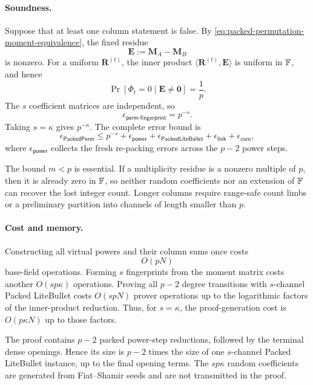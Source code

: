 \documentclass[runningheads]{llncs}
\begin{document}
\paragraph{Soundness.}
Suppose that at least one column statement is false.  By
\eqref{eq:packed-permutation-moment-equivalence}, the fixed residue
\[
    \bm E:=\bm M_A-\bm M_B
\]
is nonzero.  For a uniform \(\bm R^{(t)}\), the inner product
\(\langle\bm R^{(t)},\bm E\rangle\) is uniform in \({\mathbb{F}}\), and hence
\[
    \Pr[\Phi_t=0\mid\bm E\neq\bm0]=\frac1p.
\]
The \(s\) coefficient matrices are independent, so
\begin{equation}
    \boxed{
    \epsilon_{\mathsf{perm\mbox{-}fingerprint}}
      =p^{-s}.
    }
\label{eq:packed-permutation-soundness}
\end{equation}
Taking \(s=\kappa\) gives \(p^{-\kappa}\).  The complete error bound is
\[
    \epsilon_{\mathsf{PackedPerm}}
      \leq
      p^{-s}
      +\epsilon_{\mathsf{power}}
      +\epsilon_{\mathsf{PackedLiteBullet}}
      +\epsilon_{\mathsf{link}}
      +\epsilon_{\mathsf{com}},
\]
where \(\epsilon_{\mathsf{power}}\) collects the fresh re-packing
errors across the \(p-2\) power steps.

The bound \(m<p\) is essential.  If a multiplicity residue is a
nonzero multiple of \(p\), then it is already zero in \({\mathbb{F}}\), so
neither random coefficients nor an extension of \({\mathbb{F}}\) can recover
the lost integer count.  Longer columns require range-safe count limbs
or a preliminary partition into channels of length smaller than \(p\).

\paragraph{Cost and memory.}
Constructing all virtual powers and their column sums once costs
\begin{equation}
    O(pN)
\label{eq:packed-permutation-trace-cost}
\end{equation}
base-field operations.  Forming \(s\) fingerprints from the moment
matrix costs another \(O(sp\kappa)\) operations.  Proving all
\(p-2\) degree transitions with \(s\)-channel Packed LiteBullet costs
\(O(spN)\) prover operations up to the logarithmic factors of the
inner-product reduction.  Thus, for \(s=\kappa\), the proof-generation
cost is \(O(p\kappa N)\) up to those factors.

The proof contains \(p-2\) packed power-step reductions, followed by
the terminal dense openings.  Hence its size is \(p-2\) times the size
of one \(s\)-channel Packed LiteBullet instance, up to the final
opening terms.  The \(sp\kappa\) random coefficients are generated
from Fiat--Shamir seeds and are not transmitted in the proof.
\end{document}
